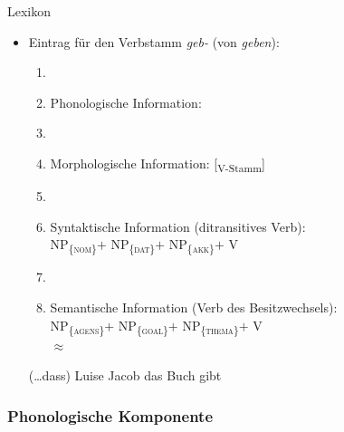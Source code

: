 \begin{frame}{Lexikon}
			
\begin{itemize}
	\item Eintrag für den Verbstamm \emph{geb-} (von \emph{geben}): 

	\begin{enumerate}
		\item[]
		\item Phonologische Information: 
		\item[]
		\item Morphologische Information: [\textsubscript{V-Stamm}] 
		\item[]
		\item Syntaktische Information (ditransitives Verb):\\
			NP\textsubscript{\{\textsc{nom}\}}$+$
			NP\textsubscript{\{\textsc{dat}\}}$+$
			NP\textsubscript{\{\textsc{akk}\}}$+$
			V
					
		\item[]
		\item Semantische Information (Verb des Besitzwechsels):\\
			NP\textsubscript{\{\textsc{agens}\}}$+$
			NP\textsubscript{\{\textsc{goal}\}}$+$
			NP\textsubscript{\{\textsc{thema}\}}$+$
			V \\
			$\approx$
	\end{enumerate}		  


\ea (\dots dass) Luise Jacob das Buch gibt
\z 
\end{itemize}

\end{frame}


\subsubsection{Phonologische Komponente}

